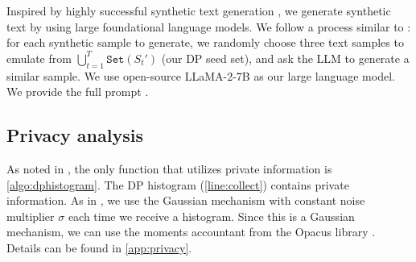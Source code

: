Inspired by highly successful synthetic text generation \citep{alpaca, wang2022self, honovich2022unnatural, roziere2023code}, we generate synthetic text by using large foundational language models.  We follow a process similar to \citet{honovich2022unnatural}: for each synthetic sample to generate, we randomly choose three text samples to emulate from $\bigcup_{t=1}^T \texttt{Set}(S_t')$ (our DP seed set), and ask the LLM to generate a similar sample.  We use open-source LLaMA-2-7B \citep{touvron2023llama} as our large language model.  We provide the full prompt .

\subsection{Privacy analysis}
As noted in \citet{lin2023differentially}, the only function that utilizes private information is \cref{algo:dphistogram}. The DP histogram (\cref{line:collect}) contains private information.  As in \citet{lin2023differentially}, we use the Gaussian mechanism with constant noise multiplier $\sigma$ each time we receive a histogram. Since this is a Gaussian mechanism, we can use the moments accountant from the Opacus library \citep{opacus}. 
Details  can be found in \cref{app:privacy}.

